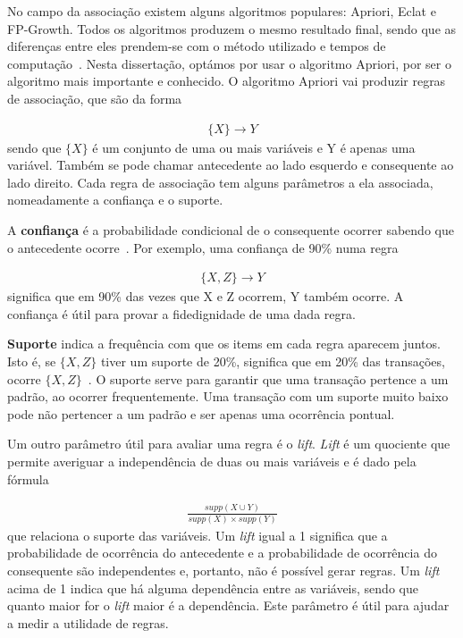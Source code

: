 No campo da associação existem alguns algoritmos populares: Apriori, Eclat e FP-Growth. Todos os algoritmos produzem o mesmo resultado final, sendo que as diferenças entre eles prendem-se com o método utilizado e tempos de computação~\cite{algs}. Nesta dissertação, optámos por usar o algoritmo Apriori, por ser o algoritmo mais importante e conhecido. O algoritmo Apriori vai produzir regras de associação, que são da forma

\begin{align*}
\{X\} \rightarrow Y 
\end{align*}
sendo que $\{X\}$ é um conjunto de uma ou mais variáveis e Y é apenas uma variável. Também se pode chamar antecedente ao lado esquerdo e consequente ao lado direito. Cada regra de associação tem alguns parâmetros a ela associada, nomeadamente a confiança e o suporte.

A \textbf{confiança} é a probabilidade condicional de o consequente ocorrer sabendo que o antecedente ocorre~\cite{oracle}. Por exemplo, uma confiança de 90\% numa regra 

\begin{align*}
\{X, Z\} \rightarrow Y  
\end{align*}
significa que em 90\% das vezes que X e Z ocorrem, Y também ocorre. A confiança é útil para provar a fidedignidade de uma dada regra.

\textbf{Suporte} indica a frequência com que os items em cada regra aparecem juntos. Isto é, se $ \{X, Z\} $ tiver um suporte de 20\%, significa que em 20\% das transações, ocorre $\{X, Z\}$~\cite{oracle}. O suporte serve para garantir que uma transação pertence a um padrão, ao ocorrer frequentemente. Uma transação com um suporte muito baixo pode não pertencer a um padrão e ser apenas uma ocorrência pontual.

Um outro parâmetro útil para avaliar uma regra é o \textit{lift}. \textit{Lift} é um quociente que permite averiguar a independência de duas ou mais variáveis e é dado pela fórmula 

\begin{align*}
\frac{supp(X\cup Y)}{supp(X)\times supp(Y)}
\end{align*}
que relaciona o suporte das variáveis. Um \textit{lift} igual a 1 significa que a probabilidade de ocorrência do antecedente e a probabilidade de ocorrência do consequente são independentes e, portanto, não é possível gerar regras. Um \textit{lift} acima de 1 indica que há alguma dependência entre as variáveis, sendo que quanto maior for o \textit{lift} maior é a dependência. Este parâmetro é útil para ajudar a medir a utilidade de regras.\newline


